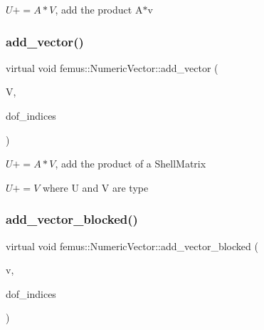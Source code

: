 $U+=A*V$, add the product A$\ast$v 

\mbox{\label{classfemus_1_1_numeric_vector_acf2d25ce69856346361c65e78df281ef}} 
\subsubsection{\texorpdfstring{add\+\_\+vector()}{add\_vector()}\hspace{0.1cm}{\footnotesize\ttfamily [4/4]}}
{\footnotesize\ttfamily virtual void femus\+::\+Numeric\+Vector\+::add\+\_\+vector (\begin{DoxyParamCaption}\item[{const \mbox{\hyperlink{classfemus_1_1_dense_vector}{Dense\+Vector}} \&}]{V,  }\item[{const std\+::vector$<$ unsigned int $>$ \&}]{dof\+\_\+indices }\end{DoxyParamCaption})\hspace{0.3cm}{\ttfamily [pure virtual]}}



$U+=A*V$, add the product of a {\ttfamily Shell\+Matrix} {\ttfamily } 

$ U+=V $ where U and V are type \mbox{\label{classfemus_1_1_numeric_vector_a0440021963af01ac49a6f02df562e44b}} 
\subsubsection{\texorpdfstring{add\+\_\+vector\+\_\+blocked()}{add\_vector\_blocked()}}
{\footnotesize\ttfamily virtual void femus\+::\+Numeric\+Vector\+::add\+\_\+vector\+\_\+blocked (\begin{DoxyParamCaption}\item[{const std\+::vector$<$ double $>$ \&}]{v,  }\item[{const std\+::vector$<$ int $>$ \&}]{dof\+\_\+indices }\end{DoxyParamCaption})\hspace{0.3cm}{\ttfamily [pure virtual]}}



